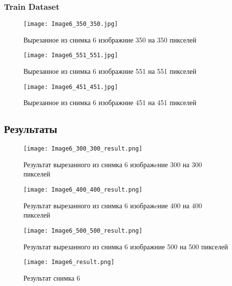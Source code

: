 \documentclass[12pt, a4paper]{report}
\begin{document}
	\newpage

	\subsubsection*{Train Dataset}
	\large
	\begin{figure}[h]
		\texttt{[image: Image6\_350\_350.jpg]}
		\caption{Вырезанное из снимка 6 изображние 350 на 350 пикселей}
	\end{figure}
	\begin{figure}
		\texttt{[image: Image6\_551\_551.jpg]}
		\caption{Вырезанное из снимка 6 изображние 551 на 551 пикселей}
	\end{figure}
	\begin{figure}
		\texttt{[image: Image6\_451\_451.jpg]}
		\caption{Вырезанное из снимка 6 изображние 451 на 451 пикселей}
	\end{figure}

	\subsection*{Результаты}
	\large
	\begin{figure}[h]
		\texttt{[image: Image6\_300\_300\_result.png]}
		\caption{Результат вырезанного из снимка 6 изображeние 300 на 300 пикселей}
	\end{figure}
	\begin{figure}
		\texttt{[image: Image6\_400\_400\_result.png]}
		\caption{Результат вырезанного из снимка 6 изображeние 400 на 400 пикселей}
	\end{figure}
	\begin{figure}
		\texttt{[image: Image6\_500\_500\_result.png]}
		\caption{Результат вырезанного из снимка 6 изображние 500 на 500 пикселей}
	\end{figure}
	\begin{figure}
		\texttt{[image: Image6\_result.png]}
		\caption{Результат снимка 6}
	\end{figure}
\end{document}
